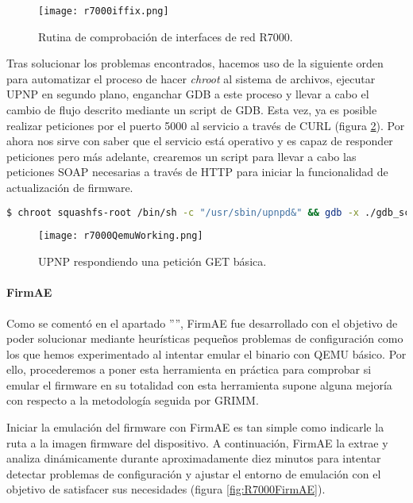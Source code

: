 \begin{figure}[H]
    \centering
    \texttt{[image: r7000iffix.png]}
    \caption{Rutina de comprobación de interfaces de red R7000.}
    \label{fig:R7000iffix}
\end{figure}

Tras solucionar los problemas encontrados, hacemos uso de la siguiente orden para automatizar el proceso de hacer \textit{chroot}
al sistema de archivos, ejecutar UPNP en segundo plano, enganchar GDB a este proceso y llevar a cabo el cambio de flujo descrito mediante un script de GDB.
Esta vez, ya es posible realizar peticiones por el puerto 5000 al servicio a través de CURL (figura \ref{fig:R7000QemuWorking}). Por ahora nos sirve 
con saber que el servicio está operativo y es capaz de responder peticiones pero más adelante, crearemos un script para llevar a cabo las peticiones 
SOAP necesarias a través de HTTP para iniciar la funcionalidad de actualización de firmware.

\begin{lstlisting}[language=bash, breaklines]
    $ chroot squashfs-root /bin/sh -c "/usr/sbin/upnpd&" && gdb -x ./gdb_script -q -p `pgrep upnpd`
\end{lstlisting}

\begin{figure}[H]
    \centering
    \texttt{[image: r7000QemuWorking.png]}
    \caption{UPNP respondiendo una petición GET básica.}
    \label{fig:R7000QemuWorking}
\end{figure}

\paragraph{FirmAE}
Como se comentó en el apartado '''', FirmAE fue desarrollado con el objetivo de poder solucionar mediante heurísticas 
pequeños problemas de configuración como los que hemos experimentado al intentar emular el binario con QEMU básico. Por ello, 
procederemos a poner esta herramienta en práctica para comprobar si emular el firmware en su totalidad con esta herramienta supone alguna mejoría con respecto a la metodología seguida
por GRIMM\cite{r7000GRIMM}.

Iniciar la emulación del firmware con FirmAE es tan simple como indicarle la ruta a la imagen firmware del dispositivo. A continuación, 
FirmAE la extrae y analiza dinámicamente durante aproximadamente diez minutos para intentar detectar problemas de configuración y 
ajustar el entorno de emulación con el objetivo de satisfacer sus necesidades (figura \ref{fig:R7000FirmAE}). 

